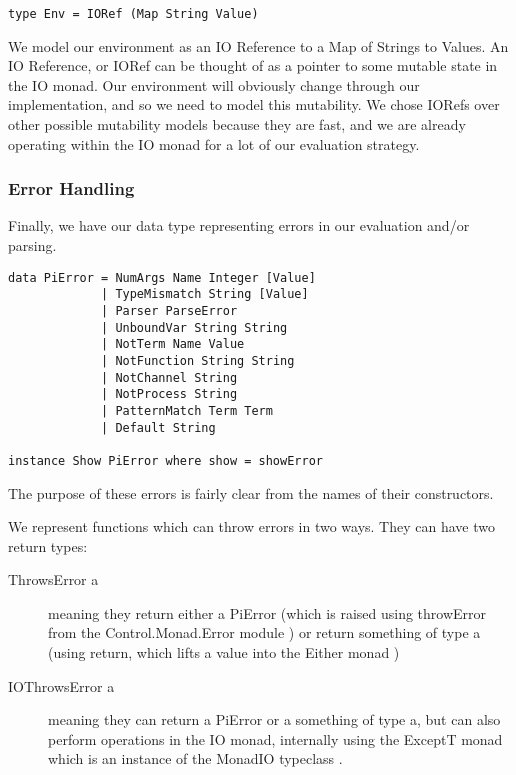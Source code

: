 \begin{description}
\begin{verbatim}
type Env = IORef (Map String Value)
\end{verbatim}

We model our environment as an IO Reference to a Map of Strings to Values. An IO Reference, or IORef \cite{hack:ioref} can be thought of as a pointer to some mutable state in the IO monad. Our environment will obviously change through our implementation, and so we need to model this mutability. We chose IORefs over other possible mutability models because they are fast, and we are already operating within the IO monad for a lot of our evaluation strategy.

\subsubsection{Error Handling}

Finally, we have our data type representing errors in our evaluation and/or parsing.

\begin{verbatim}
data PiError = NumArgs Name Integer [Value]
             | TypeMismatch String [Value]
             | Parser ParseError
             | UnboundVar String String
             | NotTerm Name Value
             | NotFunction String String
             | NotChannel String
             | NotProcess String
             | PatternMatch Term Term
             | Default String

instance Show PiError where show = showError
\end{verbatim}

The purpose of these errors is fairly clear from the names of their constructors.

We represent functions which can throw errors in two ways. They can have two return types:

\begin{description}
    \item[ThrowsError a] meaning they return either a PiError (which is raised using throwError from the Control.Monad.Error module \cite{hack:monadError}) or return something of type a (using return, which lifts a value into the Either monad \cite{hack:either})
    \item[IOThrowsError a] meaning they can return a PiError or a something of type a, but can also perform operations in the IO monad, internally using the ExceptT monad \cite{hack:monadExcept} which is an instance of the MonadIO typeclass \cite{hack:monadIO}.
\end{description}


\end{description}
